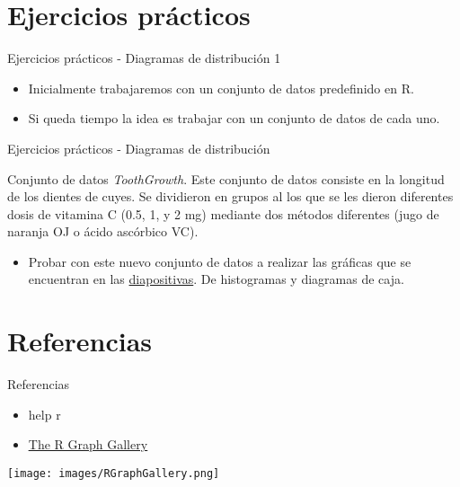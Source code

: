 \documentclass[ignorenonframetext,]{beamer}
\begin{document}
\section{Ejercicios prácticos}\label{ejercicios-practicos}

\begin{frame}{Ejercicios prácticos - Diagramas de distribución 1}

\begin{itemize}
\item Inicialmente trabajaremos con un conjunto de datos predefinido en R.
\item Si queda tiempo la idea es trabajar con un conjunto de datos de cada uno.
\end{itemize}

\end{frame}

\begin{frame}{Ejercicios prácticos - Diagramas de distribución}

Conjunto de datos \textit{ToothGrowth}. Este conjunto de datos consiste
en la longitud de los dientes de cuyes. Se dividieron en grupos al los
que se les dieron diferentes dosis de vitamina C (0.5, 1, y 2 mg)
mediante dos métodos diferentes (jugo de naranja OJ o ácido ascórbico
VC).

\begin{itemize}
\item Probar con este nuevo conjunto de datos a realizar las gráficas que se encuentran en las \href{}{diapositivas}. De histogramas y diagramas de caja.
\end{itemize}

\end{frame}

\section{Referencias}\label{referencias}

\begin{frame}{Referencias}

\begin{itemize}
\item help r
\item \underline{\textcolor{blue}{\href{https://www.r-graph-gallery.com/}{The R Graph Gallery}}}
\end{itemize}

\texttt{[image: images/RGraphGallery.png]}

\end{frame}
\end{document}
